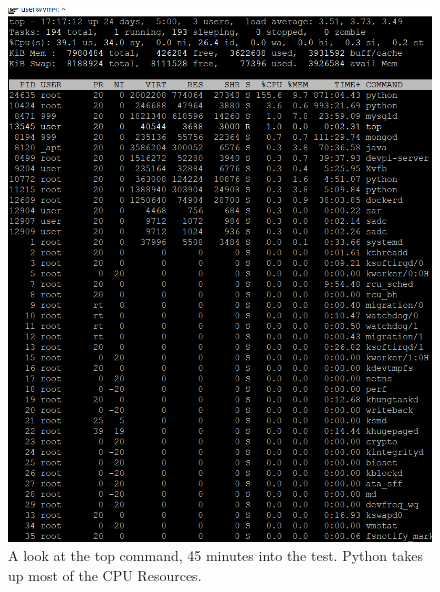 \documentclass[12pt]{report}
\begin{document}
\begin{figure}[h!]
	\centering
	\includegraphics[width=\textwidth,height=\textheight,keepaspectratio]{intro/S3_harshit.png}
	\caption{A look at the top command, 45 minutes into the test. Python takes up most of the CPU Resources.}
\end{figure}
\end{document}

